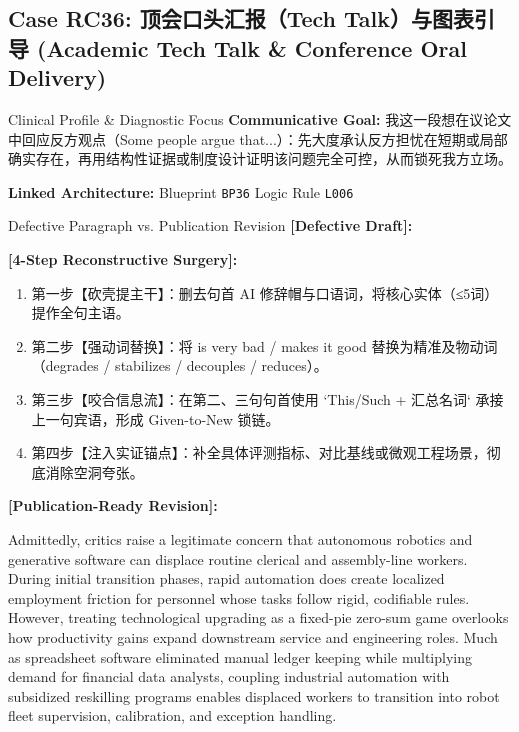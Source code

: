 \subsection{Case RC36: 顶会口头汇报（Tech Talk）与图表引导 (Academic Tech Talk \& Conference Oral Delivery)}\label{case:RC36}
\begin{ConceptBox}{Clinical Profile \& Diagnostic Focus}
\textbf{Communicative Goal:} 我这一段想在议论文中回应反方观点（Some people argue that...）：先大度承认反方担忧在短期或局部确实存在，再用结构性证据或制度设计证明该问题完全可控，从而锁死我方立场。\par
\textbf{Linked Architecture:} Blueprint \texttt{BP36} \enspace\textbar\enspace Logic Rule \texttt{L006}
\end{ConceptBox}
\begin{ExampleBox}{Defective Paragraph vs. Publication Revision}
\textbf{\color{TargetHighlight}[Defective Draft]:}\par
{}\par\vspace{6pt}
\textbf{\color{AcadForest}[4-Step Reconstructive Surgery]:}
\begin{enumerate}[label=\textbf{\color{AcadNavy}Step \arabic*:}, leftmargin=2em]
  \item 第一步【砍壳提主干】：删去句首 AI 修辞帽与口语词，将核心实体（≤5词）提作全句主语。
  \item 第二步【强动词替换】：将 is very bad / makes it good 替换为精准及物动词（degrades / stabilizes / decouples / reduces）。
  \item 第三步【咬合信息流】：在第二、三句句首使用 `This/Such + 汇总名词` 承接上一句宾语，形成 Given-to-New 锁链。
  \item 第四步【注入实证锚点】：补全具体评测指标、对比基线或微观工程场景，彻底消除空洞夸张。
\end{enumerate}\vspace{4pt}
\textbf{\color{AcadNavy}[Publication-Ready Revision]:}\par
Admittedly, critics raise a legitimate concern that autonomous robotics and generative software can displace routine clerical and assembly-line workers. During initial transition phases, rapid automation does create localized employment friction for personnel whose tasks follow rigid, codifiable rules. However, treating technological upgrading as a fixed-pie zero-sum game overlooks how productivity gains expand downstream service and engineering roles. Much as spreadsheet software eliminated manual ledger keeping while multiplying demand for financial data analysts, coupling industrial automation with subsidized reskilling programs enables displaced workers to transition into robot fleet supervision, calibration, and exception handling.
\end{ExampleBox}
